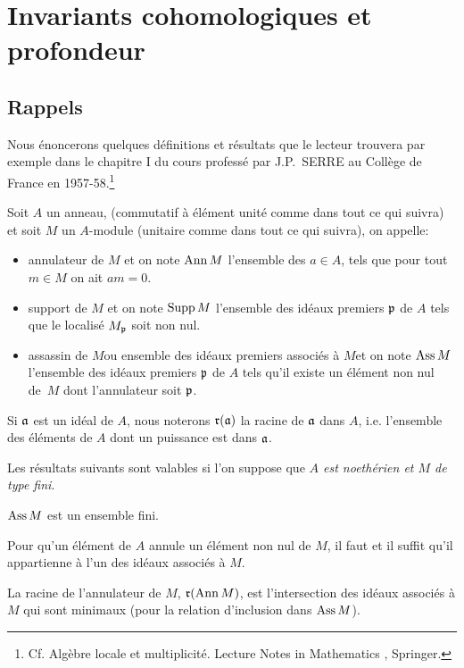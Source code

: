 \chapter{Invariants cohomologiques et profondeur} \label{III}

\section{Rappels} \label{III.1}

Nous \'enoncerons quelques d\'efinitions et r\'esultats que le lecteur trouvera par exemple dans le chapitre I du cours profess\'e par J.P.~SERRE au Coll\`ege de France en 1957-58.\footnote{\label{noteserre}Cf. Alg\`ebre locale et multiplicit\'e. Lecture Notes in Mathematics , Springer.}

\begin{definition} \label{def:III.1.1}
Soit $A$ un anneau, (commutatif \`a \'el\'ement unit\'e comme dans tout ce qui suivra) et soit $M$ un $A$-module (unitaire comme dans tout ce qui suivra), on appelle:
\begin{itemize}
\item
annulateur de $M$ et on note $\operatorname{Ann} M$ l'ensemble des $a\in A$, tels que pour tout $m\in M$ on ait $am=0$.

\item
support de $M$ et on note $\operatorname{Supp} M$ l'ensemble des id\'eaux premiers $\mathfrak{p} $ de $A$ tels que le localis\'e $M_{\mathfrak{p}}$ soit non nul.

\item
\og assassin de $M$\fg ou \og ensemble des id\'eaux premiers associ\'es \`a $M$\fg et on note $\operatorname{Ass} M$ l'ensemble des id\'eaux premiers $\mathfrak{p} $ de $A$ tels qu'il existe un \'el\'ement non nul de~$M$ dont l'annulateur soit $\mathfrak{p} $.
\end{itemize}

Si $\mathfrak{a}$ est un id\'eal de $A$, nous noterons $\mathfrak{r}(\mathfrak{a})$ la racine de $\mathfrak{a}$ dans $A$, i.e. l'ensemble des \'el\'ements de $A$ dont un puissance est dans $\mathfrak{a}$.
\end{definition}

Les r\'esultats suivants sont valables si l'on suppose que \emph{$A$ est noethérien et $M$ de type fini}.

\setcounter{subsection}{0}

\skpt

\begin{proposition} \label{III.1.1}
\begin{enumeratei}
\item
$\operatorname{Ass} M$ est un ensemble fini.

\item
Pour qu'un \'el\'ement de $A$ annule un \'el\'ement non nul de $M$, il faut et il suffit qu'il appartienne \`a l'un des id\'eaux associ\'es \`a $M$.

\item
La racine de l'annulateur de $M$, $\mathfrak{r}(\operatorname{Ann} M)$, est l'intersection des id\'eaux associ\'es \`a $M$ qui sont minimaux (pour la relation d'inclusion dans $\operatorname{Ass} M$).
\end{enumeratei}
\end{proposition}

